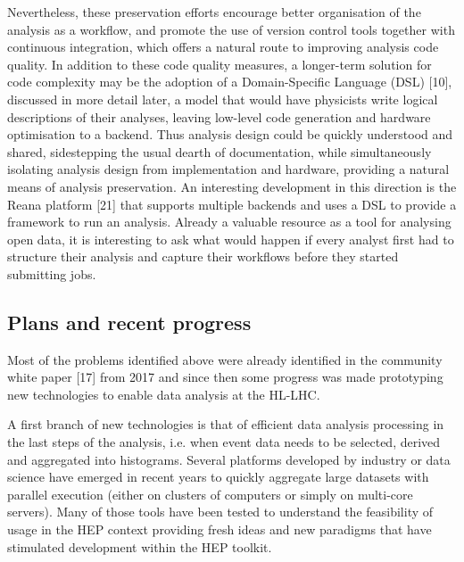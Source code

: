 \documentclass[10pt,a4paper]{article}
\begin{document}
Nevertheless, these preservation efforts encourage better organisation
of the analysis as a workflow, and promote the use of version control
tools together with continuous integration, which offers a natural route
to improving analysis code quality. In addition to these code quality
measures, a longer-term solution for code complexity may be the adoption
of a Domain-Specific Language (DSL) {[}10{]}, discussed in more detail
later, a model that would have physicists write logical descriptions of
their analyses, leaving low-level code generation and hardware
optimisation to a backend. Thus analysis design could be quickly
understood and shared, sidestepping the usual dearth of documentation,
while simultaneously isolating analysis design from implementation and
hardware, providing a natural means of analysis preservation. An
interesting development in this direction is the Reana platform {[}21{]}
that supports multiple backends and uses a DSL to provide a framework to
run an analysis. Already a valuable resource as a tool for analysing
open data, it is interesting to ask what would happen if every analyst
first had to structure their analysis and capture their workflows before
they started submitting jobs.

\hypertarget{plans-and-recent-progress}{%
\subsection{Plans and recent progress}\label{plans-and-recent-progress}}

Most of the problems identified above were already identified in the
community white paper {[}17{]} from 2017 and since then some progress
was made prototyping new technologies to enable data analysis at the
HL-LHC.

A first branch of new technologies is that of efficient data analysis
processing in the last steps of the analysis, i.e. when event data needs
to be selected, derived and aggregated into histograms. Several
platforms developed by industry or data science have emerged in recent
years to quickly aggregate large datasets with parallel execution
(either on clusters of computers or simply on multi-core servers). Many
of those tools have been tested to understand the feasibility of usage
in the HEP context providing fresh ideas and new paradigms that have
stimulated development within the HEP toolkit.
\end{document}
